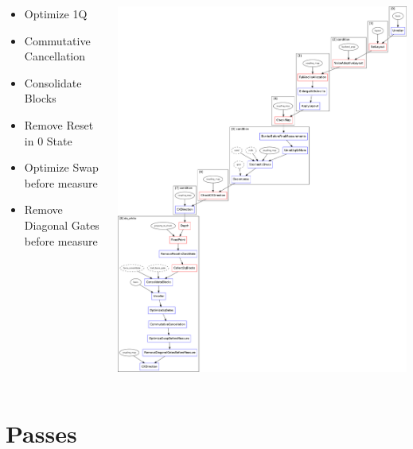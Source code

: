 \documentclass[aspectratio=169,11pt,hyperref={colorlinks=true}]{beamer}
\begin{document}
\begin{frame}
{\begin{columns}
\begin{itemize}
\begin{itemize}
                    \item Optimize 1Q
                    \item Commutative Cancellation
                    \item Consolidate Blocks
                    \item Remove Reset in 0 State
                    \item Optimize Swap before measure
                    \item Remove Diagonal Gates before measure
                \end{itemize}
        \end{itemize}
            \includegraphics[width=\textwidth,height=\textheight,keepaspectratio]{preset_level_3.png}
    \end{columns}
    }
\end{frame}

\section{Passes}
\end{document}
